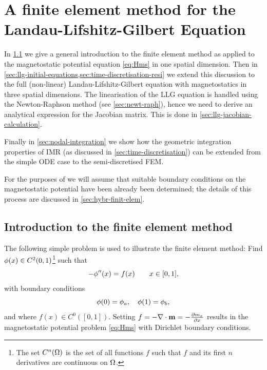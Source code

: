 \chapter{A finite element method for the Landau-Lifshitz-Gilbert Equation}
\label{sec:galerk-meth-llg}


In \cref{sec:intr-finite-ele-diff} we give a general introduction to the finite element method as applied to the magnetostatic potential equation \cref{eq:Hms} in one spatial dimension.
Then in \cref{sec:llg-initial-equations,sec:time-discretisation-resi} we extend this discussion to the full (non-linear) Landau-Lifshitz-Gilbert equation with magnetostatics in three spatial dimensions.
The linearisation of the LLG equation is handled using the Newton-Raphson method (see \cref{sec:newt-raph}), hence we need to derive an analytical expression for the Jacobian matrix.
This is done in \cref{sec:llg-jacobian-calculation}.

Finally in \cref{sec:nodal-integration} we show how the geometric integration properties of IMR (as discussed in \cref{sec:time-discretisation}) can be extended from the simple ODE case to the semi-discretised FEM.

For the purposes of  we will assume that suitable boundary conditions on the magnetostatic potential have been already been determined; the details of this process are discussed in \cref{sec:hybr-finit-elem}.

\section{Introduction to the finite element method}
\label{sec:intr-finite-ele-diff}

The following simple problem is used to illustrate the finite element method:
Find $\phi(x)\in C^{2}(0,1)$\footnote{The set $C^n(\Omega)$ is the set of all functions $f$ such that $f$ and its first $n$ derivatives are continuous on $\Omega$.} such that
\begin{equation}
  -\phi''(x) = f(x) \qquad x \in [0,1],
  \label{eq:poisson1}
\end{equation}
with boundary conditions
\begin{equation}
  \phi(0)=\phi_{a},\quad \phi(1)=\phi_{b},
\end{equation}
and where $f(x)\in C^0([0,1])$.
Setting $f = -\nabla \cdot \boldsymbol{\mathrm{m}} = -\frac{\partial m_x}{\partial x}$ results in the magnetostatic potential problem \cref{eq:Hms} with Dirichlet boundary conditions.

